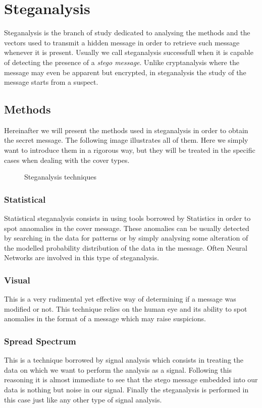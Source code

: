 \documentclass[../../main.tex]{subfiles}
\begin{document}
    
    \section{Steganalysis}
    Steganalysis is the branch of study dedicated to analysing the methods and
    the vectors used to transmit a hidden message in order to retrieve such
    message whenever it is present. Usually we call steganalysis successfull when it is capable of detecting the presence of a \emph{stego message}.
    Unlike cryptanalysis where the message may even be apparent but encrypted,
    in steganalysis the study of the message starts from a suspect.
    \subsection{Methods}
    Hereinafter we will present the methods used in steganalysis in
    order to obtain the secret message. The following image illustrates all of
    them. Here we simply want to introduce them in a rigorous way, but they will
    be treated in the specific cases when dealing with the cover types.

    \begin{figure}[h]
        \centering
        \caption{Steganalysis techniques}
    \end{figure}


    \subsubsection{Statistical}
    Statistical steganalysis consists in using tools borrowed by Statistics in
    order to spot anaomalies in the cover message. These anomalies can be
    usually detected by searching in the data for patterns or by simply
    analysing some alteration of the modelled probability distribution of the
    data in the message. Often Neural Networks are involved in this type of
    steganalysis.

    \subsubsection{Visual}
    This is a very rudimental yet effective way of determining if a message was
    modified or not. This technique relies on the human eye and its ability to
    spot anomalies in the format of a message which may raise suspicions.
    
    \subsubsection{Spread Spectrum}
    This is a technique borrowed by signal analysis which consists in treating
    the data on which we want to perform the analysis as a signal. Following
    this reasoning it is almost immediate to see that the stego message embedded
    into our data is nothing but noise in our signal. Finally the steganalysis
    is performed in this case just like any other type of signal analysis.
\end{document}

